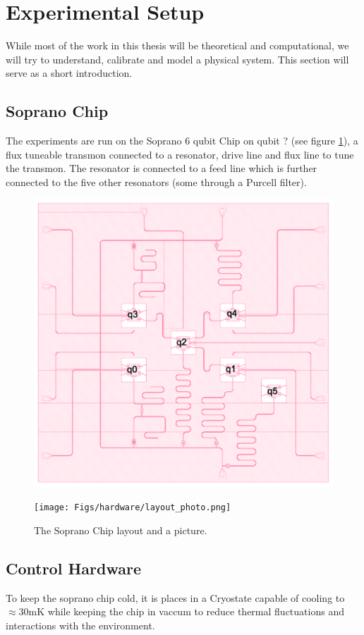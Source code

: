 \section{Experimental Setup}
While most of the work in this thesis will be theoretical and computational, we will try to understand, calibrate and model a physical system. This section will serve as a short introduction.

\subsection{Soprano Chip}
The experiments are run on the Soprano 6 qubit Chip on qubit ? (see figure \ref{fig:soprano}), a flux tuneable transmon connected to a resonator, drive line and flux line to tune the transmon. The resonator is connected to a feed line which is further connected to the five other resonators (some through a Purcell filter).

\begin{figure}[h]
    \begin{minipage}{0.50\textwidth}
        \centering
        \includegraphics[height = 5 cm]{Figs/hardware/layout.png}
    \end{minipage}
        \begin{minipage}{0.50\textwidth}
        \centering
        \texttt{[image: Figs/hardware/layout\_photo.png]}
    \end{minipage}
    \caption{The Soprano Chip layout and a picture.}
    \label{fig:soprano}
\end{figure}

\subsection{Control Hardware}




To keep the soprano chip cold, it is places in a Cryostate capable of cooling to $\approx 30 \text{mK}$ while keeping the chip in vaccum to reduce thermal fluctuations and interactions with the environment. 

